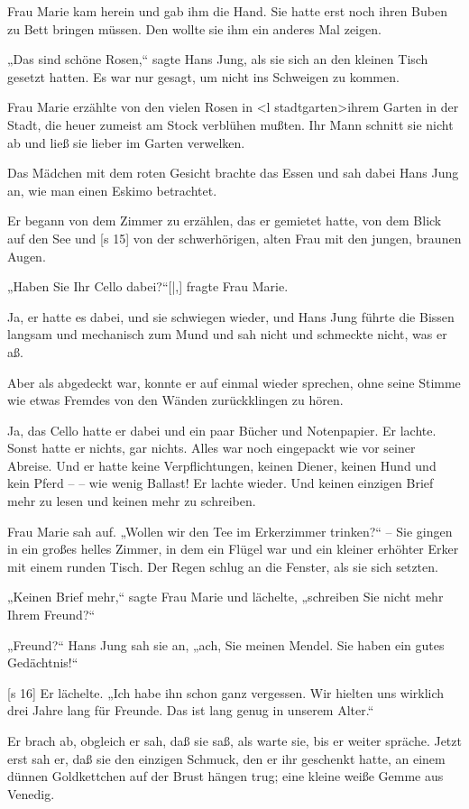 Frau Marie kam herein und gab ihm die Hand.
Sie hatte erst noch ihren Buben zu Bett bringen müssen.
Den wollte sie ihm ein anderes Mal zeigen.

„Das sind schöne Rosen,“ sagte Hans Jung, als
sie sich an den kleinen Tisch gesetzt hatten. Es war
nur gesagt, um nicht ins Schweigen zu kommen.

Frau Marie erzählte von den vielen Rosen in
<l stadtgarten>ihrem Garten in der Stadt, die heuer zumeist am
Stock verblühen mußten. Ihr Mann schnitt sie nicht
ab und ließ sie lieber im Garten verwelken.

Das Mädchen mit dem roten Gesicht brachte
das Essen und sah dabei Hans Jung an, wie man
einen Eskimo betrachtet.

Er begann von dem Zimmer zu erzählen, das
er gemietet hatte, von dem Blick auf den See und
[s 15]
von der schwerhörigen, alten Frau mit den jungen,
braunen Augen.

„Haben Sie Ihr Cello dabei?“[|,] fragte Frau Marie.

Ja, er hatte es dabei, und sie schwiegen wieder,
und Hans Jung führte die Bissen langsam und
mechanisch zum Mund und sah nicht und schmeckte
nicht, was er aß.

Aber als abgedeckt war, konnte er auf einmal
wieder sprechen, ohne seine Stimme wie etwas
Fremdes von den Wänden zurückklingen zu hören.

Ja, das Cello hatte er dabei und ein paar Bücher
und Notenpapier. Er lachte. Sonst hatte er nichts,
gar nichts. Alles war noch eingepackt wie vor seiner
Abreise. Und er hatte keine Verpflichtungen, keinen
Diener, keinen Hund und kein Pferd – – wie
wenig Ballast! Er lachte wieder. Und keinen einzigen
Brief mehr zu lesen und keinen mehr zu schreiben.

Frau Marie sah auf. „Wollen wir den Tee im
Erkerzimmer trinken?“ – Sie gingen in ein großes
helles Zimmer, in dem ein Flügel war und ein
kleiner erhöhter Erker mit einem runden Tisch. Der
Regen schlug an die Fenster, als sie sich setzten.

„Keinen Brief mehr,“ sagte Frau Marie und
lächelte, „schreiben Sie nicht mehr Ihrem Freund?“

„Freund?“ Hans Jung sah sie an, „ach, Sie
meinen Mendel. Sie haben ein gutes Gedächtnis!“

[s 16]
Er lächelte. „Ich habe ihn schon ganz vergessen.
Wir hielten uns wirklich drei Jahre lang für Freunde.
Das ist lang genug in unserem Alter.“

Er brach ab, obgleich er sah, daß sie saß, als
warte sie, bis er weiter spräche. Jetzt erst sah er,
daß sie den einzigen Schmuck, den er ihr geschenkt
hatte, an einem dünnen Goldkettchen auf der Brust
hängen trug; eine kleine weiße Gemme aus Venedig.

